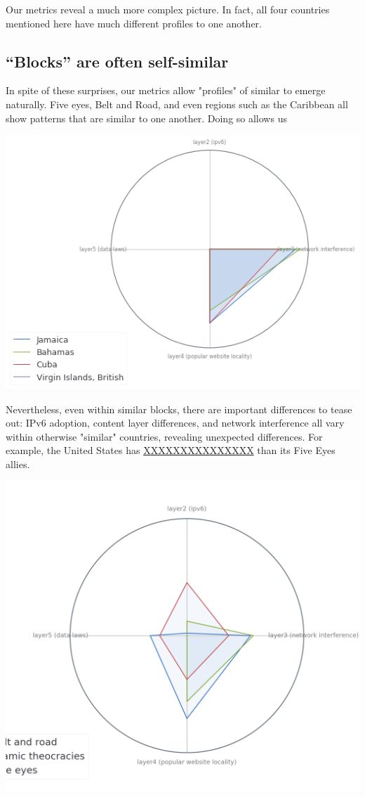 \documentclass[11pt]{article}
\begin{document}
Our metrics reveal a much more complex picture. In fact, all four countries
mentioned here have much different profiles to one another.

\subsection{``Blocks'' are often self-similar}
\label{sec:org2862232}

In spite of these surprises, our metrics allow "profiles" of similar to emerge
naturally. Five eyes, Belt and Road, and even regions such as the Caribbean all
show patterns that are similar to one another. Doing so allows us

\begin{center}
\includegraphics[width=.9\linewidth]{./figures/carribbean.png}
\end{center}
Nevertheless, even within similar blocks, there are important differences to
tease out: IPv6 adoption, content layer differences, and network interference
all vary within otherwise "similar" countries, revealing unexpected differences.
For example, the United States has \uline{XXXXXXXXXXXXXXX} than its Five Eyes allies.

\begin{center}
\includegraphics[width=.9\linewidth]{./figures/three-bloc.png}
\end{center}
\end{document}
